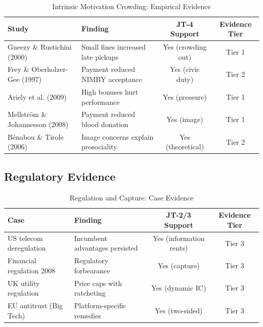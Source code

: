 \begin{table}[htbp]
\centering
\caption{Intrinsic Motivation Crowding: Empirical Evidence}
\label{tab:jt-crowding-evidence}
\begin{tabular}{llcc}
\toprule
\textbf{Study} & \textbf{Finding} & \textbf{JT-4 Support} & \textbf{Evidence Tier} \\
\midrule
Gneezy \& Rustichini (2000) & Small fines increased late pickups & Yes (crowding out) & Tier 1 \\
Frey \& Oberholzer-Gee (1997) & Payment reduced NIMBY acceptance & Yes (civic duty) & Tier 2 \\
Ariely et al. (2009) & High bonuses hurt performance & Yes (pressure) & Tier 1 \\
Mellström \& Johannesson (2008) & Payment reduced blood donation & Yes (image) & Tier 1 \\
Bénabou \& Tirole (2006) & Image concerns explain prosociality & Yes (theoretical) & Tier 2 \\
\bottomrule
\end{tabular}
\end{table}

\subsection{Regulatory Evidence}

\begin{table}[htbp]
\centering
\caption{Regulation and Capture: Case Evidence}
\label{tab:jt-regulation-evidence}
\begin{tabular}{llcc}
\toprule
\textbf{Case} & \textbf{Finding} & \textbf{JT-2/3 Support} & \textbf{Evidence Tier} \\
\midrule
US telecom deregulation & Incumbent advantages persisted & Yes (information rents) & Tier 3 \\
Financial regulation 2008 & Regulatory forbearance & Yes (capture) & Tier 3 \\
UK utility regulation & Price caps with ratcheting & Yes (dynamic IC) & Tier 3 \\
EU antitrust (Big Tech) & Platform-specific remedies & Yes (two-sided) & Tier 3 \\
\bottomrule
\end{tabular}
\end{table}

